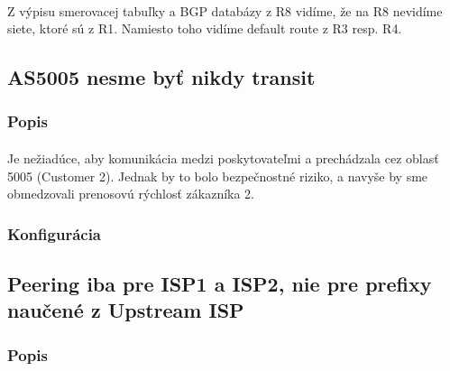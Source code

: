 \documentclass[12pt,twoside,a4paper]{report}
\begin{document}
\paragraph{}
Z výpisu smerovacej tabuľky a BGP databázy z R8 vidíme, že na R8 nevidíme siete, ktoré sú z R1. Namiesto toho vidíme default route z R3 resp. R4.


\subsection{AS5005 nesme byť nikdy transit}
\subsubsection{Popis}
\paragraph{}
Je nežiadúce, aby komunikácia medzi poskytovateľmi  a  prechádzala cez oblasť 5005 (Customer 2). Jednak by to bolo bezpečnostné riziko, a navyše by sme obmedzovali prenosovú rýchlosť zákazníka 2.

\subsubsection{Konfigurácia}
\paragraph{}

\noindent
{\selectfont
{}
}



\subsection{Peering iba pre ISP1 a ISP2, nie pre prefixy naučené z Upstream ISP}
\subsubsection{Popis}
\end{document}
